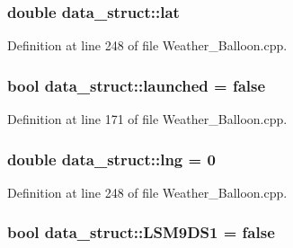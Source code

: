 \subsubsection[{\texorpdfstring{lat}{lat}}]{\setlength{\rightskip}{0pt plus 5cm}double data\+\_\+struct\+::lat}\hypertarget{structdata__struct_a497f7c781a63c489b7fbd8ca4282a055}{}\label{structdata__struct_a497f7c781a63c489b7fbd8ca4282a055}


Definition at line 248 of file Weather\+\_\+\+Balloon.\+cpp.

\subsubsection[{\texorpdfstring{launched}{launched}}]{\setlength{\rightskip}{0pt plus 5cm}bool data\+\_\+struct\+::launched = false}\hypertarget{structdata__struct_acebeac8bcb741e46517b79c4b8bb8ed5}{}\label{structdata__struct_acebeac8bcb741e46517b79c4b8bb8ed5}


Definition at line 171 of file Weather\+\_\+\+Balloon.\+cpp.

\subsubsection[{\texorpdfstring{lng}{lng}}]{\setlength{\rightskip}{0pt plus 5cm}double data\+\_\+struct\+::lng = 0}\hypertarget{structdata__struct_a6655cd46a79571a9fc4c3d4c6ece133c}{}\label{structdata__struct_a6655cd46a79571a9fc4c3d4c6ece133c}


Definition at line 248 of file Weather\+\_\+\+Balloon.\+cpp.

\subsubsection[{\texorpdfstring{L\+S\+M9\+D\+S1}{LSM9DS1}}]{\setlength{\rightskip}{0pt plus 5cm}bool data\+\_\+struct\+::\+L\+S\+M9\+D\+S1 = false}\hypertarget{structdata__struct_a3ebcb5ba29d9ce30ce02d8bf5fa0f997}{}\label{structdata__struct_a3ebcb5ba29d9ce30ce02d8bf5fa0f997}


